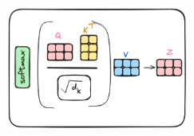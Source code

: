 \documentclass{article}
\begin{document}
\begin{minipage}{0.5\textwidth}
\includegraphics[width=6cm, height=5cm]{Transformer/Images/SelfAttention5.png}
\end{minipage}

\end{document}
